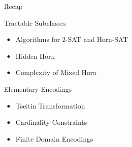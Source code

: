 \documentclass[t]{sdqbeamer}
\begin{document}
\begin{frame}{Recap}
	\vspace{-2em}
	\begin{block}{Tractable Subclasses}
	\begin{itemize}\setlength{\itemsep}{1ex}
		\item Algorithms for 2-SAT and Horn-SAT
		\item Hidden Horn 
		\item Complexity of Mixed Horn
	\end{itemize}
	\end{block}
	\begin{block}{Elementary Encodings}
	\begin{itemize}\setlength{\itemsep}{1em}
		\item Tseitin Transformation
		\item Cardinality Constraints
		\item Finite Domain Encodings
	\end{itemize}
	\end{block}
\end{frame}
\end{document}
